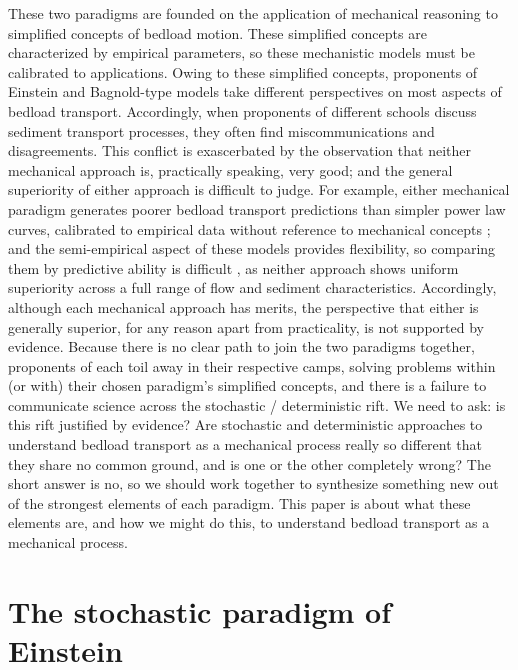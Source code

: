\documentclass{article}
\begin{document}
These two paradigms are founded on the application of mechanical reasoning to simplified concepts of bedload motion.
These simplified concepts are characterized by empirical parameters, so these mechanistic models must be calibrated to applications. 
Owing to these simplified concepts, proponents of Einstein and Bagnold-type models take different perspectives on most aspects of bedload transport.
Accordingly, when proponents of different schools discuss sediment transport processes, they often find miscommunications and disagreements. 
This conflict is exascerbated by the observation that neither mechanical approach is, practically speaking, very good; and the general superiority of either approach is difficult to judge. 
For example, either mechanical paradigm generates poorer bedload transport predictions than simpler power law curves, calibrated to empirical data without reference to mechanical concepts \citep{Barry2004}; and the semi-empirical aspect of these models provides flexibility, so comparing them by predictive ability is difficult \citep{Iverson2013}, as neither approach shows uniform superiority across a full range of flow and sediment characteristics. 
Accordingly, although each mechanical approach has merits, the perspective that either is generally superior, for any reason apart from practicality, is not supported by evidence.  
Because there is no clear path to join the two paradigms together, proponents of each toil away in their respective camps, solving problems within (or with) their chosen paradigm's simplified concepts, and there is a failure to communicate science across the stochastic / deterministic rift. 
We need to ask: is this rift justified by evidence? 
Are stochastic and deterministic approaches to understand bedload transport as a mechanical process really so different that they share no common ground, and is one or the other completely wrong? 
The short answer is no, so we should work together to synthesize something new out of the strongest elements of each paradigm.
This paper is about what these elements are, and how we might do this, to understand bedload transport as a mechanical process. 


\section{The stochastic paradigm of Einstein}
\end{document}
